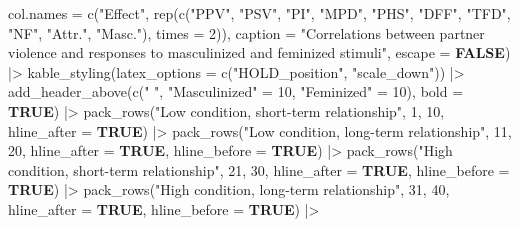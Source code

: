 \documentclass[
  bookmarksnumbered]{article}
\newenvironment{Shaded}{\begin{snugshade}}{\end{snugshade}}
\newcommand{\AttributeTok}[1]{\textcolor[rgb]{0.80,0.80,0.80}{#1}}
\newcommand{\ConstantTok}[1]{\textcolor[rgb]{0.86,0.64,0.64}{\textbf{#1}}}
\newcommand{\DecValTok}[1]{\textcolor[rgb]{0.86,0.86,0.80}{#1}}
\newcommand{\FunctionTok}[1]{\textcolor[rgb]{0.94,0.94,0.56}{#1}}
\newcommand{\NormalTok}[1]{\textcolor[rgb]{0.80,0.80,0.80}{#1}}
\newcommand{\OtherTok}[1]{\textcolor[rgb]{0.94,0.94,0.56}{#1}}
\newcommand{\SpecialCharTok}[1]{\textcolor[rgb]{0.86,0.64,0.64}{#1}}
\newcommand{\StringTok}[1]{\textcolor[rgb]{0.80,0.58,0.58}{#1}}
\begin{document}
\begin{Shaded}
\begin{Highlighting}[]
        \AttributeTok{col.names =} \FunctionTok{c}\NormalTok{(}\StringTok{"Effect"}\NormalTok{,}
                      \FunctionTok{rep}\NormalTok{(}\FunctionTok{c}\NormalTok{(}\StringTok{"PPV"}\NormalTok{, }\StringTok{"PSV"}\NormalTok{, }\StringTok{"PI"}\NormalTok{, }\StringTok{"MPD"}\NormalTok{, }\StringTok{"PHS"}\NormalTok{, }\StringTok{"DFF"}\NormalTok{, }
                          \StringTok{"TFD"}\NormalTok{, }\StringTok{"NF"}\NormalTok{, }\StringTok{"Attr."}\NormalTok{, }\StringTok{"Masc."}\NormalTok{), }\AttributeTok{times =} \DecValTok{2}\NormalTok{)),}
        \AttributeTok{caption =} \StringTok{"Correlations between partner violence and responses to masculinized and }
\StringTok{        feminized stimuli"}\NormalTok{,}
        \AttributeTok{escape =} \ConstantTok{FALSE}\NormalTok{) }\SpecialCharTok{|\textgreater{}}
  \FunctionTok{kable\_styling}\NormalTok{(}\AttributeTok{latex\_options =} \FunctionTok{c}\NormalTok{(}\StringTok{"HOLD\_position"}\NormalTok{, }\StringTok{"scale\_down"}\NormalTok{)) }\SpecialCharTok{|\textgreater{}} 
  \FunctionTok{add\_header\_above}\NormalTok{(}\FunctionTok{c}\NormalTok{(}\StringTok{" "}\NormalTok{,}
                     \StringTok{"Masculinized"} \OtherTok{=} \DecValTok{10}\NormalTok{, }
                     \StringTok{"Feminized"} \OtherTok{=} \DecValTok{10}\NormalTok{),}
                   \AttributeTok{bold =} \ConstantTok{TRUE}\NormalTok{) }\SpecialCharTok{|\textgreater{}} 
  \FunctionTok{pack\_rows}\NormalTok{(}\StringTok{"Low condition, short{-}term relationship"}\NormalTok{, }\DecValTok{1}\NormalTok{, }\DecValTok{10}\NormalTok{,}
            \AttributeTok{hline\_after =} \ConstantTok{TRUE}\NormalTok{) }\SpecialCharTok{|\textgreater{}} 
  \FunctionTok{pack\_rows}\NormalTok{(}\StringTok{"Low condition, long{-}term relationship"}\NormalTok{, }\DecValTok{11}\NormalTok{, }\DecValTok{20}\NormalTok{,}
            \AttributeTok{hline\_after =} \ConstantTok{TRUE}\NormalTok{, }\AttributeTok{hline\_before =} \ConstantTok{TRUE}\NormalTok{) }\SpecialCharTok{|\textgreater{}}
  \FunctionTok{pack\_rows}\NormalTok{(}\StringTok{"High condition, short{-}term relationship"}\NormalTok{, }\DecValTok{21}\NormalTok{, }\DecValTok{30}\NormalTok{,}
            \AttributeTok{hline\_after =} \ConstantTok{TRUE}\NormalTok{, }\AttributeTok{hline\_before =} \ConstantTok{TRUE}\NormalTok{) }\SpecialCharTok{|\textgreater{}} 
  \FunctionTok{pack\_rows}\NormalTok{(}\StringTok{"High condition, long{-}term relationship"}\NormalTok{, }\DecValTok{31}\NormalTok{, }\DecValTok{40}\NormalTok{,}
            \AttributeTok{hline\_after =} \ConstantTok{TRUE}\NormalTok{, }\AttributeTok{hline\_before =} \ConstantTok{TRUE}\NormalTok{) }\SpecialCharTok{|\textgreater{}} 

\end{Highlighting}
\end{Shaded}
\end{document}
